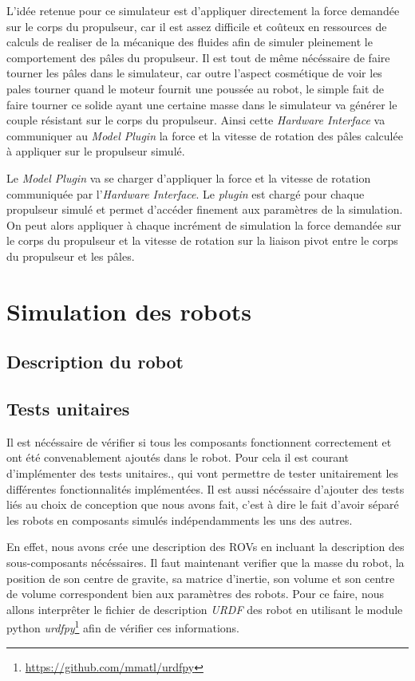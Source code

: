 				L'idée retenue pour ce simulateur est d'appliquer directement la force demandée sur le corps du propulseur, car il est assez difficile et coûteux en ressources de calculs de realiser de la mécanique des fluides afin de simuler pleinement le comportement des pâles du propulseur. Il est tout de même nécéssaire de faire tourner les pâles dans le simulateur, car outre l'aspect cosmétique de voir les pales tourner quand le moteur fournit une poussée au robot, le simple fait de faire tourner ce solide ayant une certaine masse dans le simulateur va générer le couple résistant sur le corps du propulseur. Ainsi cette \textit{Hardware Interface} va communiquer au \textit{Model Plugin} la force et la vitesse de rotation des pâles calculée à appliquer sur le propulseur simulé.
	
				Le \textit{Model Plugin} va se charger d'appliquer la force et la vitesse de rotation communiquée par l'\textit{Hardware Interface}. Le \textit{plugin} est chargé pour chaque propulseur simulé et permet d'accéder finement aux paramètres de la simulation. On peut alors appliquer à chaque incrément de simulation la force demandée sur le corps du propulseur et la vitesse de rotation sur la liaison pivot entre le corps du propulseur et les pâles.

	\section{Simulation des robots}

		\subsection{Description du robot}

		\subsection{Tests unitaires}
				
			Il est nécéssaire de vérifier si tous les composants fonctionnent correctement et ont été convenablement ajoutés dans le robot. Pour cela il est courant d'implémenter des tests unitaires., qui vont permettre de tester unitairement les différentes fonctionnalités implémentées. Il est aussi nécéssaire d'ajouter des tests liés au choix de conception que nous avons fait, c'est à dire le fait d'avoir séparé les robots en composants simulés indépendamments les uns des autres.

			En effet, nous avons crée une description des \gls{ROV}s en incluant la description des sous-composants nécéssaires. Il faut maintenant verifier que la masse du robot, la position de son centre de gravite, sa matrice d'inertie, son volume et son centre de volume correspondent bien aux paramètres des robots. Pour ce faire, nous allons interprêter le fichier de description \textit{URDF} des robot en utilisant le module python \textit{urdfpy}\footnote{\url{https://github.com/mmatl/urdfpy}} afin de vérifier ces informations.

